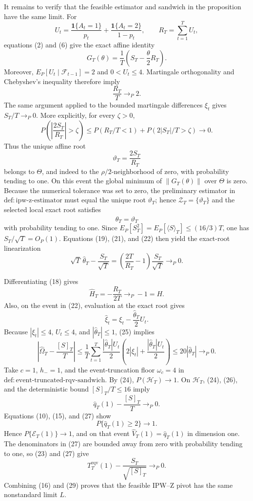 It remains to verify that the feasible estimator and sandwich in the proposition have the same limit.  For
\[
 U_t=\frac{\mathbf1\{A_t=1\}}{p_t}
 +\frac{\mathbf1\{A_t=2\}}{1-p_t},
 \qquad R_T=\sum_{t=1}^TU_t,
\]
equations (2) and (6) give the exact affine identity
\[
 G_T(\theta)=\frac1T\left(S_T-\frac\theta2R_T\right).
\tag{18}
\]
Moreover, \(E_P[U_t\mid\mathcal F_{t-1}]=2\) and \(0<U_t\le4\).  Martingale orthogonality and Chebyshev's inequality therefore imply
\[
 \frac{R_T}{T}\to_P2.
\tag{19}
\]
The same argument applied to the bounded martingale differences \(\xi_t\) gives \(S_T/T\to_P0\).  More explicitly, for every \(\zeta>0\),
\[
 P\!\left(\left|\frac{2S_T}{R_T}\right|>\zeta\right)
 \le P(R_T/T<1)+P(2|S_T|/T>\zeta)\longrightarrow0.
\tag{20}
\]
Thus the unique affine root
\[
 \vartheta_T=\frac{2S_T}{R_T}
\tag{21}
\]
belongs to \(\Theta\), and indeed to the \(\rho/2\)-neighborhood of zero, with probability tending to one.  On this event the global minimum of \(\|G_T(\theta)\|\) over \(\Theta\) is zero.  Because the numerical tolerance was set to zero, the preliminary estimator in \(\mathrm{def:ipw\text{-}z\text{-}estimator}\) must equal the unique root \(\vartheta_T\); hence \(\mathcal Z_T=\{\vartheta_T\}\) and the selected local exact root satisfies
\[
 \widehat\theta_T=\vartheta_T
\tag{22}
\]
with probability tending to one.  Since \(E_P[S_T^2]=E_P[\langle S\rangle_T]\le(16/3)T\), one has \(S_T/\sqrt T=O_P(1)\).  Equations (19), (21), and (22) then yield the exact-root linearization
\[
 \sqrt T\,\widehat\theta_T-\frac{S_T}{\sqrt T}
 =\left(\frac{2T}{R_T}-1\right)\frac{S_T}{\sqrt T}
 \to_P0.
\tag{23}
\]

Differentiating (18) gives
\[
 \widehat H_T=-\frac{R_T}{2T}\to_P-1=H.
\tag{24}
\]
Also, on the event in (22), evaluation at the exact root gives
\[
 \widehat\xi_t=\xi_t-\frac{\widehat\theta_T}{2}U_t.
\tag{25}
\]
Because \(|\xi_t|\le4\), \(U_t\le4\), and \(|\widehat\theta_T|\le1\), (25) implies
\[
 \left|\widehat\Omega_T-\frac{[S]_T}{T}\right|
 \le\frac1T\sum_{t=1}^T
 \frac{|\widehat\theta_T|U_t}{2}
 \left(2|\xi_t|+\frac{|\widehat\theta_T|U_t}{2}\right)
 \le20|\widehat\theta_T|
 \to_P0.
\tag{26}
\]
Take \(c=1\), \(h_-=1\), and the event-truncation floor \(\omega_c=4\) in \(\mathrm{def:event\text{-}truncated\text{-}rqv\text{-}sandwich}\).  By (24), \(P(\mathcal H_T)\to1\).  On \(\mathcal H_T\), (24), (26), and the deterministic bound \([S]_T/T\le16\) imply
\[
 \widehat q_T(1)-\frac{[S]_T}{T}\to_P0.
\tag{27}
\]
Equations (10), (15), and (27) show
\[
 P\{\widehat q_T(1)\ge2\}\longrightarrow1.
\tag{28}
\]
Hence \(P\{\mathcal E_T(1)\}\to1\), and on that event \(\widehat V_T(1)=\widehat q_T(1)\) in dimension one.  The denominators in (27) are bounded away from zero with probability tending to one, so (23) and (27) give
\[
 T_T^{\mathrm{rqv}}(1)
 -\frac{S_T}{\sqrt{[S]_T}}
 \to_P0.
\tag{29}
\]
Combining (16) and (29) proves that the feasible IPW--Z pivot has the same nonstandard limit \(L\).

